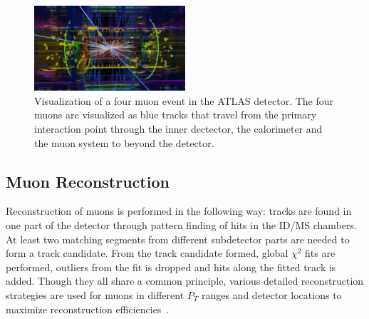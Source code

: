 \begin{figure}[!htb]
    \begin{center}
        \includegraphics[width=0.5\textwidth]{figures/common_ana/Muon}
        \caption{        
            Visualization of a four muon event in the ATLAS detector\cite{ATLAS:1697053}. The four muons are visualized as blue tracks that travel from the primary interaction point through the inner dectector, the calorimeter and the muon system to beyond the detector.
        }
        \label{fig:muon}
    \end{center}
\end{figure}

\subsection{Muon Reconstruction}
Reconstruction of muons is performed in the following way: tracks are found in one part of the detector through pattern finding of hits in the ID/MS chambers. At least two matching segments from different subdetector parts are needed to form a track candidate. From the track candidate formed, global $\chi^{2}$ fits are performed, outliers from the fit is dropped and hits along the fitted track is added. Though they all share a common principle, various detailed reconstruction strategies are used for muons in
different $P_{T}$ ranges and detector locations to maximize reconstruction efficiencies~\cite{muonReco2016}.

